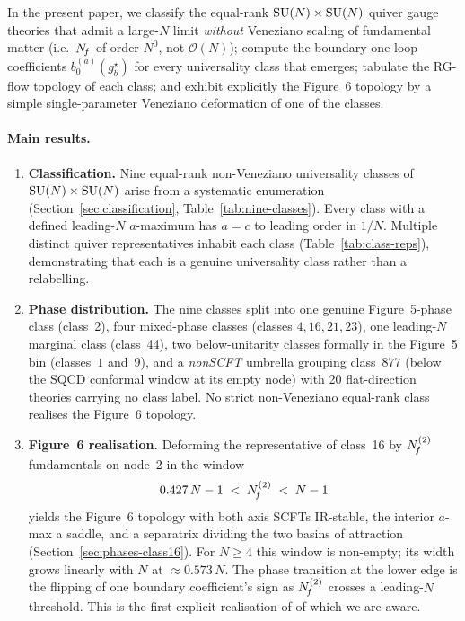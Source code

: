 \medskip
In the present paper, we classify the equal-rank
$\mathrm{SU}(N)\times\mathrm{SU}(N)$ quiver gauge theories that admit a large-$N$
limit \emph{without} Veneziano scaling of fundamental matter (i.e.\
$N_{\!f}$ of order $N^{0}$, not $\mathcal O(N)$); compute the boundary
one-loop coefficients $b_{0}^{(a)}(g_{b}^{\star})$ for every
universality class that emerges; tabulate the RG-flow topology of
each class; and exhibit explicitly the Figure~6 topology by a simple
single-parameter Veneziano deformation of one of the classes.

\paragraph{Main results.}

\begin{enumerate}\setlength{\itemsep}{3pt}
  \item \textbf{Classification.}  Nine equal-rank non-Veneziano
    universality classes of $\mathrm{SU}(N)\times\mathrm{SU}(N)$ arise from a
    systematic enumeration (Section~\ref{sec:classification},
    Table~\ref{tab:nine-classes}).  Every class with a defined
    leading-$N$ $a$-maximum has $a=c$ to leading order in $1/N$.
    Multiple distinct quiver representatives inhabit each class
    (Table~\ref{tab:class-reps}), demonstrating that each is a
    genuine universality class rather than a relabelling.

  \item \textbf{Phase distribution.}  The nine classes split into
    one genuine Figure~5-phase class (class~2), four mixed-phase
    classes (classes $4,16,21,23$), one leading-$N$ marginal class
    (class~44), two below-unitarity classes formally in the Figure~5
    bin (classes~$1$ and~$9$), and a \emph{nonSCFT} umbrella grouping
    class~$877$ (below the SQCD conformal window at its empty node)
    with 20 flat-direction theories carrying no class label.  No
    strict non-Veneziano equal-rank class realises the Figure~6
    topology.

  \item \textbf{Figure~6 realisation.}  Deforming the representative
    of class~16 by $N_{\!f}^{(2)}$ fundamentals on node~2 in the window
    \begin{equation}
      0.427\,N-1\;<\;N_{\!f}^{(2)}\;<\;N-1
      \label{eq:main-window}
    \end{equation}
    yields the Figure~6 topology with both axis SCFTs IR-stable,
    the interior $a$-max a saddle, and a separatrix dividing the
    two basins of attraction (Section~\ref{sec:phases-class16}).  For
    $N\ge 4$ this window is non-empty; its width grows linearly with
    $N$ at $\approx 0.573\,N$.  The phase transition at the lower
    edge is the flipping of one boundary coefficient's sign as
    $N_{\!f}^{(2)}$ crosses a leading-$N$ threshold.  This is the first
    explicit realisation of \cite[Fig.~6]{IW2005} of which we are
    aware.
\end{enumerate}

